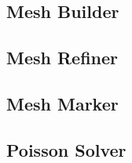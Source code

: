 \subsection{Mesh Builder}


\newpage
\subsection{Mesh Refiner}


\newpage
\subsection{Mesh Marker}


\newpage
\subsection{Poisson Solver}
